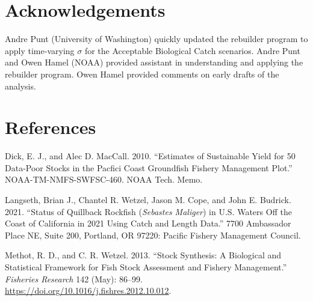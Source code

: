 \documentclass[11pt,
  english,
  a4paper,
]{article}
\begin{document}
\leavevmode\tagmcend\tagstructend\par


\hypertarget{acknowledgements}{%
\section{Acknowledgements}\label{acknowledgements}}

\leavevmode\tagmcend\tagstructend


Andre Punt (University of Washington) quickly updated the rebuilder program to apply time-varying {\(\sigma\)\leavevmode\tagmcend\tagstructend} for the Acceptable Biological Catch scenarios. Andre Punt and Owen Hamel (NOAA) provided assistant in understanding and applying the rebuilder program. Owen Hamel provided comments on early drafts of the analysis.

\leavevmode\tagmcend\tagstructend\par

\clearpage


\hypertarget{references}{%
\section{References}\label{references}}

\leavevmode\tagmcend\tagstructend


\hypertarget{refs}{}
\leavevmode\hypertarget{ref-DickandMacCall_dbsra_2010}{}%
Dick, E. J., and Alec D. MacCall. 2010. ``Estimates of Sustainable Yield for 50 Data-Poor Stocks in the Pacfici Coast Groundfish Fishery Management Plot.'' NOAA-TM-NMFS-SWFSC-460. NOAA Tech. Memo.

\leavevmode\hypertarget{ref-Langseth_status_2021}{}%
Langseth, Brian J., Chantel R. Wetzel, Jason M. Cope, and John E. Budrick. 2021. ``Status of Quillback Rockfish (\emph{Sebastes Maliger}) in U.S. Waters Off the Coast of California in 2021 Using Catch and Length Data.'' 7700 Ambassador Place NE, Suite 200, Portland, OR 97220: Pacific Fishery Management Council.

\leavevmode\hypertarget{ref-methot_stock_2013}{}%
Methot, R. D., and C. R. Wetzel. 2013. ``Stock Synthesis: A Biological and Statistical Framework for Fish Stock Assessment and Fishery Management.'' \emph{Fisheries Research} 142 (May): 86--99. \url{https://doi.org/10.1016/j.fishres.2012.10.012}.
\end{document}
